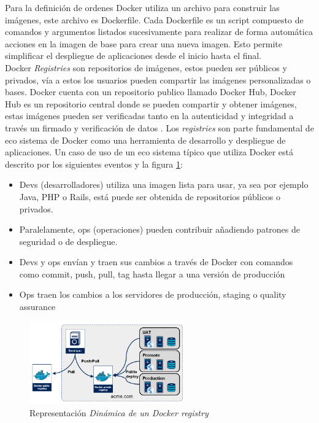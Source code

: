     Para la definición de ordenes Docker utiliza un archivo para construir las imágenes, este archivo es Dockerfile. Cada Dockerfile es un script compuesto de  comandos y argumentos listados sucesivamente para realizar de forma automática acciones en la imagen de base para crear una nueva imagen. Esto permite simplificar el despliegue de aplicaciones desde el inicio hasta el final. \\
    
	Docker \textit{Registries} son repositorios de imágenes, estos pueden ser públicos y privados, vía a estos los usuarios pueden compartir las imágenes personalizadas o bases. Docker cuenta con un repositorio publico llamado Docker Hub, Docker Hub es un repositorio central donde se pueden compartir y obtener imágenes, estas imágenes pueden ser verificadas tanto en la autenticidad y integridad a través un firmado y verificación de datos \cite{bui2015analysis}. Los \textit{registries} son parte fundamental de eco sistema de Docker como una herramienta de desarrollo y despliegue de aplicaciones. Un caso de uso de un eco sistema típico que utiliza Docker está descrito por los siguientes eventos y la figura \ref{fig:dynamic}:
	\begin{itemize}
		\item Devs (desarrolladores) utiliza una imagen lista para usar, ya sea por ejemplo Java, PHP o Rails, está puede ser obtenida de repositorios públicos o privados.
		\item Paralelamente, ops (operaciones) pueden contribuir añadiendo patrones de seguridad o de despliegue.
		\item Devs y ops envían y traen sus cambios a través de Docker con comandos como commit, push, pull, tag hasta llegar a una versión de producción
		\item Ops traen los cambios a los servidores de producción, staging o quality assurance
	\end{itemize}
	
\begin{figure}[]
  \centering
  \includegraphics[width=0.6\textwidth]{Figures/registry-dynamic.png}
    \caption{Representación \textit{Dinámica de un \textit{Docker registry} }}
    \label{fig:dynamic}
\end{figure}	
	
